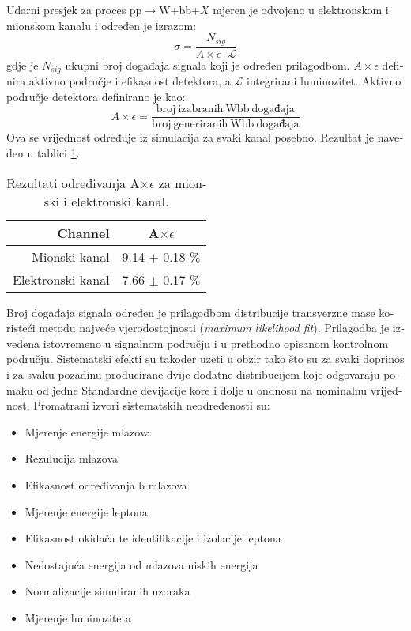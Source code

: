 \begin{otherlanguage}{croatian}
Udarni presjek za proces pp$\rightarrow$W+bb+$X$ mjeren je odvojeno u elektronskom i mionskom kanalu i određen je izrazom:
\begin{equation}
\sigma = \frac{N_{sig}}{A\times \epsilon \cdot \mathcal{L}}
\label{equ:xsec_hr}
\end{equation}
gdje je $N_{sig}$ ukupni broj događaja signala koji je određen prilagodbom. $A\times \epsilon$ definira aktivno područje i efikasnost detektora, a $\mathcal{L}$ integrirani luminozitet. 
Aktivno područje detektora definirano je kao:
\begin{equation}
A\times \epsilon=\frac{\mathrm{broj\ izabranih\ Wbb\ događaja}}{\mathrm{broj\ generiranih\ Wbb\ događaja}}
\end{equation}
Ova se vrijednost određuje iz simulacija za svaki kanal posebno. Rezultat je naveden u tablici \ref{tab:AE_hr}.
\begin{table}[!htb]
\begin{center}
   \begin{tabular} {r c} \hline \hline
        Channel         & A$\times \epsilon$ \\
        \hline
        Mionski kanal         & 9.14 $\pm$ 0.18 $\%$ \\
        Elektronski kanal     & 7.66 $\pm$ 0.17 $\%$ \\
        \hline\hline
   \end{tabular}
\caption{Rezultati određivanja A$\times \epsilon$ za mionski i elektronski kanal.}
\label{tab:AE_hr}
\end{center}
\end{table}
Broj događaja signala određen je prilagodbom distribucije transverzne mase koristeći metodu najveće vjerodostojnosti (\textit{maximum likelihood fit}). Prilagodba je izvedena istovremeno u signalnom području i u prethodno opisanom kontrolnom području. Sistematski efekti su također uzeti u obzir tako što su za svaki doprinos i za svaku pozadinu producirane dvije dodatne distribucijem koje odgovaraju pomaku od jedne Standardne devijacije kore i dolje u ondnosu na nominalnu vrijednost. Promatrani izvori sistematskih neodređenosti su:
\begin{itemize}
\item Mjerenje energije mlazova
\item Rezulucija mlazova
\item Efikasnost određivanja b mlazova
\item Mjerenje energije leptona
\item Efikasnost okidača te identifikacije i izolacije leptona
\item Nedostajuća energija od mlazova niskih energija
\item Normalizacije simuliranih uzoraka
\item Mjerenje luminoziteta
\end{itemize}


\end{otherlanguage}
